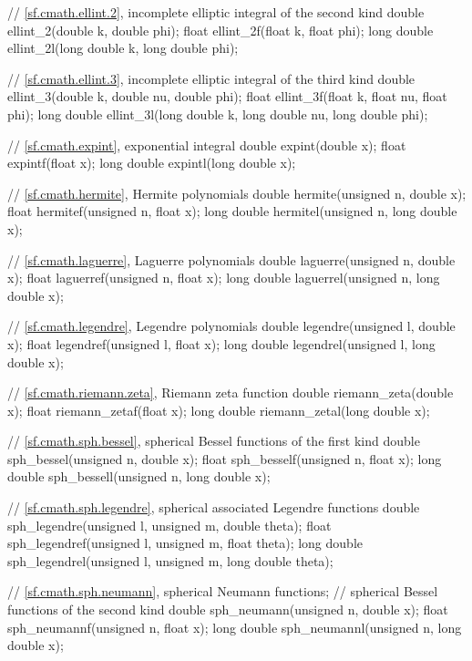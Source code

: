 \begin{codeblock}
{  // \ref{sf.cmath.ellint.2}, incomplete elliptic integral of the second kind
  double       ellint_2(double k, double phi);
  float        ellint_2f(float k, float phi);
  long double  ellint_2l(long double k, long double phi);

  // \ref{sf.cmath.ellint.3}, incomplete elliptic integral of the third kind
  double       ellint_3(double k, double nu, double phi);
  float        ellint_3f(float k, float nu, float phi);
  long double  ellint_3l(long double k, long double nu, long double phi);

  // \ref{sf.cmath.expint}, exponential integral
  double       expint(double x);
  float        expintf(float x);
  long double  expintl(long double x);

  // \ref{sf.cmath.hermite}, Hermite polynomials
  double       hermite(unsigned n, double x);
  float        hermitef(unsigned n, float x);
  long double  hermitel(unsigned n, long double x);

  // \ref{sf.cmath.laguerre}, Laguerre polynomials
  double       laguerre(unsigned n, double x);
  float        laguerref(unsigned n, float x);
  long double  laguerrel(unsigned n, long double x);

  // \ref{sf.cmath.legendre}, Legendre polynomials
  double       legendre(unsigned l, double x);
  float        legendref(unsigned l, float x);
  long double  legendrel(unsigned l, long double x);

  // \ref{sf.cmath.riemann.zeta}, Riemann zeta function
  double       riemann_zeta(double x);
  float        riemann_zetaf(float x);
  long double  riemann_zetal(long double x);

  // \ref{sf.cmath.sph.bessel}, spherical Bessel functions of the first kind
  double       sph_bessel(unsigned n, double x);
  float        sph_besself(unsigned n, float x);
  long double  sph_bessell(unsigned n, long double x);

  // \ref{sf.cmath.sph.legendre}, spherical associated Legendre functions
  double       sph_legendre(unsigned l, unsigned m, double theta);
  float        sph_legendref(unsigned l, unsigned m, float theta);
  long double  sph_legendrel(unsigned l, unsigned m, long double theta);

  // \ref{sf.cmath.sph.neumann}, spherical Neumann functions;
  // spherical Bessel functions of the second kind
  double       sph_neumann(unsigned n, double x);
  float        sph_neumannf(unsigned n, float x);
  long double  sph_neumannl(unsigned n, long double x);
}
\end{codeblock}

